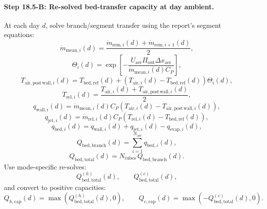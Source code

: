 \documentclass[11pt]{article}
\begin{document}
\paragraph{Step 18.5-B: Re-solved bed-transfer capacity at day ambient.}
At each day \(d\), solve branch/segment transfer using the report's segment equations:
\begin{equation}
\dot m_{\mathrm{mean},i}(d)=\frac{\dot m_{\mathrm{rem},i}(d)+\dot m_{\mathrm{rem},i+1}(d)}{2},
\tag{47}
\end{equation}
\begin{equation}
\Theta_i(d)=\exp\!\left[-\frac{U_{\mathrm{aer}}\Pi_{\mathrm{out}}\Delta x_{\mathrm{aer}}}{\dot m_{\mathrm{mean},i}(d)C_P}\right],
\tag{49}
\end{equation}
\begin{equation}
T_{\mathrm{air,post\,wall},i}(d)=T_{\mathrm{bed,ref}}(d)+\left(T_{\mathrm{air},i}(d)-T_{\mathrm{bed,ref}}(d)\right)\Theta_i(d),
\tag{50}
\end{equation}
\begin{equation}
T_{\mathrm{rel},i}(d)=\frac{T_{\mathrm{air},i}(d)+T_{\mathrm{air,post\,wall},i}(d)}{2},
\tag{52}
\end{equation}
\begin{equation}
q_{\mathrm{wall},i}(d)=\dot m_{\mathrm{mean},i}(d)C_P\left(T_{\mathrm{air},i}(d)-T_{\mathrm{air,post\,wall},i}(d)\right),
\tag{44}
\end{equation}
\begin{equation}
q_{\mathrm{jet},i}(d)=\dot m_{\mathrm{rel},i}(d)C_P\left(T_{\mathrm{rel},i}(d)-T_{\mathrm{bed,ref}}(d)\right),
\tag{43}
\end{equation}
\begin{equation}
q_{\mathrm{bed},i}(d)=q_{\mathrm{wall},i}(d)+q_{\mathrm{jet},i}(d)-q_{\mathrm{evap},i}(d),
\tag{42}
\end{equation}
\begin{equation}
Q_{\mathrm{bed,branch}}(d)=\sum_{i=1}^{N_{\mathrm{aer}}} q_{\mathrm{bed},i}(d),
\tag{45}
\end{equation}
\begin{equation}
Q_{\mathrm{bed,total}}(d)=N_{\mathrm{tubes}}\,Q_{\mathrm{bed,branch}}(d).
\tag{54}
\end{equation}
Use mode-specific re-solves:
\begin{equation}
Q_{\mathrm{bed,total}}^{(h)}(d),\qquad Q_{\mathrm{bed,total}}^{(c)}(d),
\tag{18.5B-1}
\end{equation}
and convert to positive capacities:
\begin{equation}
Q_{h,\mathrm{cap}}(d)=\max\!\left(Q_{\mathrm{bed,total}}^{(h)}(d),0\right),\qquad
Q_{c,\mathrm{cap}}(d)=\max\!\left(-Q_{\mathrm{bed,total}}^{(c)}(d),0\right).
\tag{18.5B-2}
\end{equation}
\end{document}
